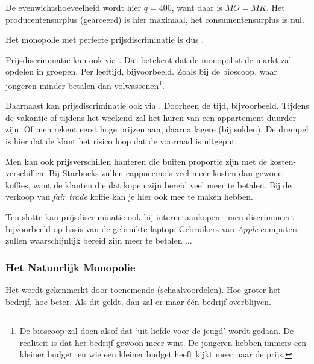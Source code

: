 De evenwichtshoeveelheid wordt hier $q=400$, want daar is $MO=MK$. Het producentensurplus (gearceerd) is hier maximaal, het consumentensurplus is nul.
\par Het monopolie met perfecte prijsdiscriminatie is dus .\\

\par Prijsdiscriminatie kan ook via . Dat betekent dat de monopolist de markt zal opdelen in groepen. Per leeftijd, bijvoorbeeld. Zoals bij de bioscoop, waar jongeren minder betalen dan volwassenen\footnote{De bioscoop zal doen alsof dat `uit liefde voor de jeugd' wordt gedaan. De realiteit is dat het bedrijf gewoon meer wint. De jongeren hebben immers een kleiner budget, en wie een kleiner budget heeft kijkt meer naar de prijs.}.\\

\par Daarnaast kan prijsdiscriminatie ook via . Doorheen de tijd, bijvoorbeeld. Tijdens de vakantie of tijdens het weekend zal het huren van een appartement duurder zijn. Of men rekent eerst hoge prijzen aan, daarna lagere (bij solden). De drempel is hier dat de klant het risico loop dat de voorraad is uitgeput.
\par Men kan ook prijsverschillen hanteren die buiten proportie zijn met de kosten-verschillen. Bij Starbucks zullen cappuccino's veel meer kosten dan gewone koffies, want de klanten die dat kopen zijn bereid veel meer te betalen. Bij de verkoop van \textit{fair trade} koffie kan je hier ook mee te maken hebben.
\par Ten slotte kan prijsdiscriminatie ook bij internetaankopen ; men discrimineert bijvoorbeeld op basis van de gebruikte laptop. Gebruikers van \textit{Apple} computers zullen waarschijnlijk bereid zijn meer te betalen ...

\subsubsection{Het Natuurlijk Monopolie}

Het  wordt gekenmerkt door toenemende  (schaalvoordelen). Hoe groter het bedrijf, hoe beter. Als dit geldt, dan zal er maar \'e\'en bedrijf overblijven.\\

